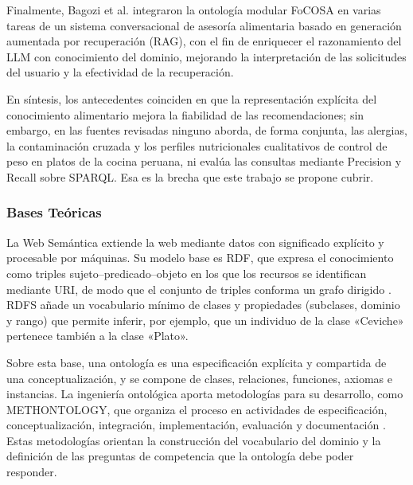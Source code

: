 \documentclass[conference]{IEEEtran}
\begin{document}
Finalmente, Bagozi et al. \cite{bagozi2026} integraron la ontología modular FoCOSA en varias tareas de un sistema conversacional de asesoría alimentaria basado en generación aumentada por recuperación (RAG), con el fin de enriquecer el razonamiento del LLM con conocimiento del dominio, mejorando la interpretación de las solicitudes del usuario y la efectividad de la recuperación.

En síntesis, los antecedentes coinciden en que la representación explícita del conocimiento alimentario mejora la fiabilidad de las recomendaciones; sin embargo, en las fuentes revisadas ninguno aborda, de forma conjunta, las alergias, la contaminación cruzada y los perfiles nutricionales cualitativos de control de peso en platos de la cocina peruana, ni evalúa las consultas mediante Precision y Recall sobre SPARQL. Esa es la brecha que este trabajo se propone cubrir.

\subsubsection{Bases Teóricas}
La Web Semántica extiende la web mediante datos con significado explícito y procesable por máquinas. Su modelo base es RDF, que expresa el conocimiento como triples sujeto--predicado--objeto en los que los recursos se identifican mediante URI, de modo que el conjunto de triples conforma un grafo dirigido \cite{allemang2008}. RDFS añade un vocabulario mínimo de clases y propiedades (subclases, dominio y rango) que permite inferir, por ejemplo, que un individuo de la clase «Ceviche» pertenece también a la clase «Plato».

Sobre esta base, una ontología es una especificación explícita y compartida de una conceptualización, y se compone de clases, relaciones, funciones, axiomas e instancias. La ingeniería ontológica aporta metodologías para su desarrollo, como METHONTOLOGY, que organiza el proceso en actividades de especificación, conceptualización, integración, implementación, evaluación y documentación \cite{gomezperez2004}. Estas metodologías orientan la construcción del vocabulario del dominio y la definición de las preguntas de competencia que la ontología debe poder responder.
\end{document}
